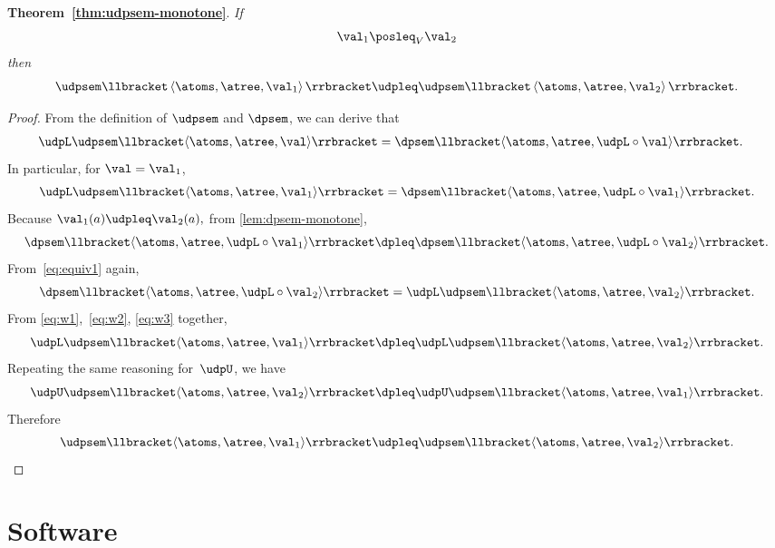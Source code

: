 \textbf{Theorem~\ref{thm:udpsem-monotone}}. \emph{If
    \[
        \val_{1}\posleq_{V}\val_{2}
    \]
    then
    \[
        \udpsem\llbracket\left\langle \atoms,\atree,\val_{1}\right\rangle \rrbracket\udpleq\udpsem\llbracket\left\langle \atoms,\atree,\val_{2}\right\rangle \rrbracket.
    \]
}
\begin{proof}
    From the definition of $\udpsem$ and $\dpsem$, we can derive that
    \begin{align}
        \udpL\udpsem\llbracket\langle\atoms,\atree,\val\rangle\rrbracket & =\dpsem\llbracket\langle\atoms,\atree,\udpL\circ\val\rangle\rrbracket.\label{eq:equiv1}
    \end{align}
    In particular, for $\val=\val_{1}$,
    \begin{equation}
        \udpL\udpsem\llbracket\langle\atoms,\atree,\val_{1}\rangle\rrbracket=\dpsem\llbracket\langle\atoms,\atree,\udpL\circ\val_{1}\rangle\rrbracket.\label{eq:w1}
    \end{equation}
    Because $\val_{1}(a)\udpleq\val_{2}(a),$ from \cref{lem:dpsem-monotone},
    \begin{equation}
        \dpsem\llbracket\langle\atoms,\atree,\udpL\circ\val_{1}\rangle\rrbracket\dpleq\dpsem\llbracket\langle\atoms,\atree,\udpL\circ\val_{2}\rangle\rrbracket.\label{eq:w2}
    \end{equation}
    From~\cref{eq:equiv1} again,
    \begin{equation}
        \dpsem\llbracket\langle\atoms,\atree,\udpL\circ\val_{2}\rangle\rrbracket=\udpL\udpsem\llbracket\langle\atoms,\atree,\val_{2}\rangle\rrbracket.\label{eq:w3}
    \end{equation}
    From \cref{eq:w1},~\cref{eq:w2}, \cref{eq:w3} together,
    \[
        \udpL\udpsem\llbracket\langle\atoms,\atree,\val_{1}\rangle\rrbracket\dpleq\udpL\udpsem\llbracket\langle\atoms,\atree,\val_{2}\rangle\rrbracket.
    \]
    Repeating the same reasoning for~$\udpU$, we have
    \[
        \udpU\udpsem\llbracket\langle\atoms,\atree,\val_{2}\rangle\rrbracket\dpleq\udpU\udpsem\llbracket\langle\atoms,\atree,\val_{1}\rangle\rrbracket.
    \]
    Therefore
    \[
        \udpsem\llbracket\langle\atoms,\atree,\val_{1}\rangle\rrbracket\udpleq\udpsem\llbracket\langle\atoms,\atree,\val_{2}\rangle\rrbracket.
    \]
\end{proof}

\vfill\pagebreak


\section{Software}


